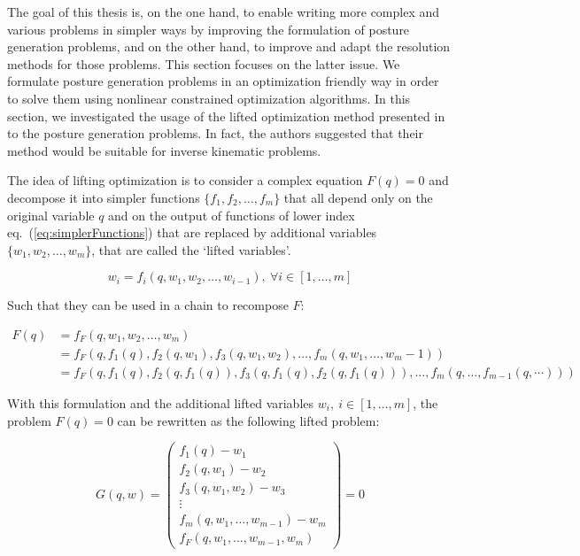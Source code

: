 The goal of this thesis is, on the one hand, to enable writing more complex and various problems in simpler ways by improving the formulation of posture generation problems, and on the other hand, to improve and adapt the resolution methods for those problems.
This section focuses on the latter issue.
We formulate posture generation problems in an optimization friendly way in order to solve them using nonlinear constrained optimization algorithms.
In this section, we investigated the usage of the lifted optimization method presented in~\cite{Albersmeyer:2010:LNM:1958447.1958472} to the posture generation problems.
In fact, the authors suggested that their method would be suitable for inverse kinematic problems.

The idea of lifting optimization is to consider a complex equation $F(q) = 0$ and decompose it into simpler functions $\{f_1, f_2, \ldots, f_m\}$ that all depend only on the original variable $q$ and on the output of functions of lower index eq.~(\ref{eq:simplerFunctions}) that are replaced by additional variables $\{w_1, w_2, \ldots, w_m\}$, that are called the `lifted variables'.

\begin{equation}
\label{eq:simplerFunctions}
  w_i = f_i(q, w_1, w_2, \ldots,w_{i-1}),\ \forall i\in[1,\ldots, m]
\end{equation}

Such that they can be used in a chain to recompose $F$:

\begin{align}
  F(q) &= f_F\left(q, w_1, w_2, \ldots, w_m\right)\\
       &= f_F\left(q, f_1(q), f_2(q,w_1), f_3(q,w_1,w_2), \ldots, f_m(q, w_1, \ldots, w_m-1)\right) \\
       &= f_F\left(q, f_1(q), f_2(q,f_1(q)), f_3(q,f_1(q),f_2(q,f_1(q))), \ldots, f_m(q, \ldots, f_{m-1}(q,\cdots))\right)
\end{align}

With this formulation and the additional lifted variables $w_i,\ i\in[1,\ldots, m]$, the problem $F(q) = 0$ can be rewritten as the following lifted problem:

\begin{equation}
\label{eq:lifted_variables}
  G(q,w) =
  \begin{pmatrix}
  f_1(q) - w_1 \\
  f_2(q,w_1) - w_2 \\
  f_3(q,w_1,w_2) - w_3 \\
  \vdots \\
  f_m(q,w_1,\ldots, w_{m-1}) - w_m \\
  f_F(q,w_1,\ldots, w_{m-1}, w_m)
  \end{pmatrix}
  =0
\end{equation}

